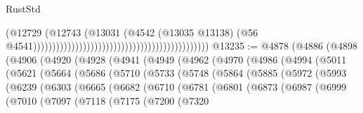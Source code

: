 \begin{lexlean}{RustStd}
\begin{coremodule}
                                                                                      (@12729
                                                                                        (@12743
                                                                                          (@13031
                                                                                            (@4542
                                                                                              (@13035
                                                                                                @13138)
                                                                                              (@56
                                                                                                @4541))))))))))))))))))))))))))))))))))))))))))))))
@13235 := @4878
    (@4886
      (@4898
        (@4906
          (@4920
            (@4928
              (@4941
                (@4949
                  (@4962
                    (@4970
                      (@4986
                        (@4994
                          (@5011
                            (@5621
                              (@5664
                                (@5686
                                  (@5710
                                    (@5733
                                      (@5748
                                        (@5864
                                          (@5885
                                            (@5972
                                              (@5993
                                                (@6239
                                                  (@6303
                                                    (@6665
                                                      (@6682
                                                        (@6710
                                                          (@6781
                                                            (@6801
                                                              (@6873
                                                                (@6987
                                                                  (@6999
                                                                    (@7010
                                                                      (@7097
                                                                        (@7118
                                                                          (@7175
                                                                            (@7200
                                                                              (@7320

\end{coremodule}
\end{lexlean}

